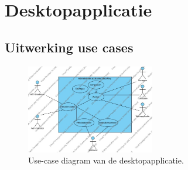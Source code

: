 \section{Desktopapplicatie}

\subsection{Uitwerking use cases}

\begin{figure}[h!]
	\centering
		\includegraphics[width=0.5\textwidth]{images/analyse/ucd_desktop}
	\caption{Use-case diagram van de desktopapplicatie.}
\end{figure}

